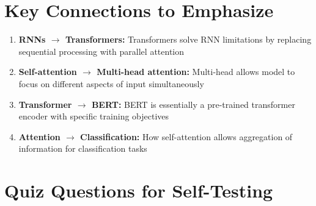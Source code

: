 \section*{Key Connections to Emphasize}

\begin{enumerate}
    \item \textbf{RNNs $\rightarrow$ Transformers:} Transformers solve RNN limitations by replacing sequential processing with parallel attention
    \item \textbf{Self-attention $\rightarrow$ Multi-head attention:} Multi-head allows model to focus on different aspects of input simultaneously
    \item \textbf{Transformer $\rightarrow$ BERT:} BERT is essentially a pre-trained transformer encoder with specific training objectives
    \item \textbf{Attention $\rightarrow$ Classification:} How self-attention allows aggregation of information for classification tasks
\end{enumerate}

\section*{Quiz Questions for Self-Testing}

